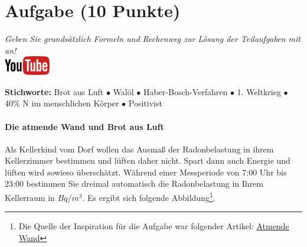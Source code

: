 \documentclass[a4paper, 9pt]{scrartcl}\usepackage[]{graphicx}\usepackage[]{xcolor}
\begin{document}
 
\clearpage

\section{Aufgabe \hfill (10 Punkte)}

\textit{Geben Sie grundsätzlich Formeln und Rechenweg zur L{\"o}sung der
  Teilaufgaben mit an!} \\[1Ex]

\hfill\href{https://youtu.be/4-dSaPMhK9s}{\includegraphics[width =
  2cm]{img/youtube}} %
\hspace{2Ex}

{\tiny\textbf{Stichworte:} Brot aus Luft $\bullet$ Walöl $\bullet$ Haber-Bosch-Verfahren $\bullet$ 1. Weltkrieg $\bullet$ 40\% N im menschlichen Körper $\bullet$ Positivist}

\paragraph{Die atmende Wand und Brot aus Luft}



Als Kellerkind vom Dorf wollen das Ausmaß der Radonbelastung in ihrem Kellerzimmer bestimmen und
lüften daher nicht. Spart dann auch Energie und lüften wird sowieso überschätzt. Während einer Messperiode von 7:00 Uhr bis
23:00 bestimmen Sie dreimal automatisch die Radonbelastung in
Ihrem Kellerraum in $Bq/m^3$. Es ergibt sich folgende Abbildung\footnote{Die Quelle der Inspiration
  für die Aufgabe war folgender Artikel:
  \href{https://de.wikipedia.org/wiki/Atmende_Wand}{Atmende Wand}}.
\end{document}
